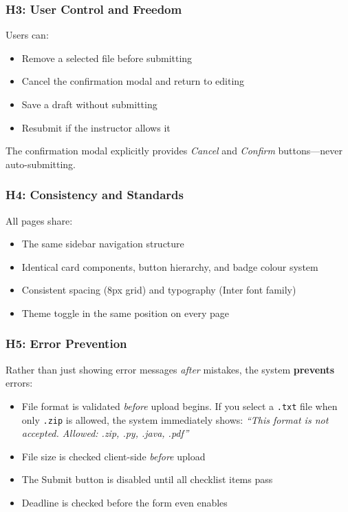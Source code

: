\documentclass[12pt, a4paper]{article}
\begin{document}
\subsubsection{H3: User Control and Freedom}

Users can:
\begin{itemize}[noitemsep]
  \item Remove a selected file before submitting
  \item Cancel the confirmation modal and return to editing
  \item Save a draft without submitting
  \item Resubmit if the instructor allows it
\end{itemize}

The confirmation modal explicitly provides \textit{Cancel} and \textit{Confirm} buttons—never auto-submitting.

\subsubsection{H4: Consistency and Standards}

All pages share:
\begin{itemize}[noitemsep]
  \item The same sidebar navigation structure
  \item Identical card components, button hierarchy, and badge colour system
  \item Consistent spacing (8px grid) and typography (Inter font family)
  \item Theme toggle in the same position on every page
\end{itemize}

\subsubsection{H5: Error Prevention}

Rather than just showing error messages \textit{after} mistakes, the system \textbf{prevents} errors:
\begin{itemize}[noitemsep]
  \item File format is validated \textit{before} upload begins. If you select a \texttt{.txt} file when only \texttt{.zip} is allowed, the system immediately shows: \textit{``This format is not accepted. Allowed: .zip, .py, .java, .pdf''}
  \item File size is checked client-side \textit{before} upload
  \item The Submit button is disabled until all checklist items pass
  \item Deadline is checked before the form even enables
\end{itemize}
\end{document}
